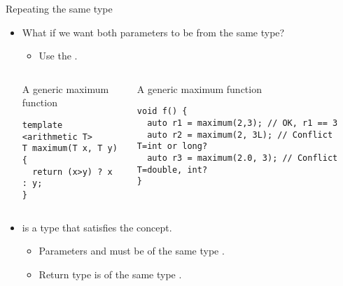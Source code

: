 \begin{frame}[t,fragile]{Repeating the same type}
\begin{itemize}
  \item What if we want both parameters to be from  the same type?
    \begin{itemize}
      \item Use the .
    \end{itemize}


\begin{columns}[T]


\begin{block}{A generic maximum function}
\begin{lstlisting}
template <arithmetic T>
T maximum(T x, T y) {
  return (x>y) ? x : y;
}
\end{lstlisting}
\end{block}


\pause
\begin{block}{A generic maximum function}
\begin{lstlisting}
void f() {
  auto r1 = maximum(2,3); // OK, r1 == 3
  auto r2 = maximum(2, 3L); // Conflict T=int or long?
  auto r3 = maximum(2.0, 3); // Conflict T=double, int?
}
\end{lstlisting}

\end{block}

\end{columns}

  \item {} is a type that satisfies the  concept.
    \begin{itemize}
      \item Parameters  and  must be of the same type .
      \item Return type is of the same type .
    \end{itemize} 

\end{itemize}
\end{frame}

